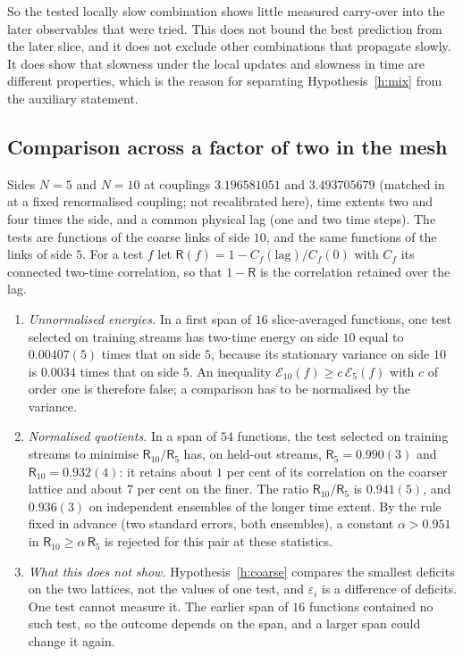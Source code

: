 So the tested locally slow combination shows little measured carry-over into the later observables that were
tried. This does not bound the best prediction from the later slice, and it does not exclude other
combinations that propagate slowly. It does show that slowness under the local updates and slowness in time
are different properties, which is the reason for separating Hypothesis~\ref{h:mix} from the auxiliary
statement.

\subsection{Comparison across a factor of two in the mesh}\label{s:cross}
Sides $N=5$ and $N=10$ at couplings $3.196581051$ and $3.493705679$ (matched in~\cite{RepoData} at a fixed
renormalised coupling; not recalibrated here), time extents two and four times the side, and a common physical
lag (one and two time steps). The tests are functions of the coarse links of side $10$, and the same
functions of the links of side $5$. For a test $f$ let $\mathsf R(f)=1-C_f(\mathrm{lag})/C_f(0)$ with $C_f$ its
connected two-time correlation, so that $1-\mathsf R$ is the correlation retained over the lag.
\begin{enumerate}
\item \emph{Unnormalised energies.} In a first span of $16$ slice-averaged functions, one test selected on
training streams has two-time energy on side $10$ equal to $0.00407(5)$ times that on side $5$, because its
stationary variance on side $10$ is $0.0034$ times that on side $5$. An inequality
$\mathcal E_{10}(f)\ge c\,\mathcal E_5(f)$ with $c$ of order one is therefore false; a comparison has to be
normalised by the variance.
\item \emph{Normalised quotients.} In a span of $54$ functions, the test selected on training streams to
minimise $\mathsf R_{10}/\mathsf R_5$ has, on held-out streams, $\mathsf R_5=0.990(3)$ and
$\mathsf R_{10}=0.932(4)$: it retains about $1$ per cent of its correlation on the coarser lattice and about
$7$ per cent on the finer. The ratio $\mathsf R_{10}/\mathsf R_5$ is $0.941(5)$, and $0.936(3)$ on independent
ensembles of the longer time extent. By the rule fixed in advance (two standard errors, both ensembles), a
constant $\alpha>0.951$ in $\mathsf R_{10}\ge\alpha\,\mathsf R_5$ is rejected for this pair at these statistics.
\item \emph{What this does not show.} Hypothesis~\ref{h:coarse} compares the smallest deficits on the two
lattices, not the values of one test, and $\varepsilon_i$ is a difference of deficits. One test cannot measure
it. The earlier span of $16$ functions contained no such test, so the outcome depends on the span, and a
larger span could change it again.
\end{enumerate}

